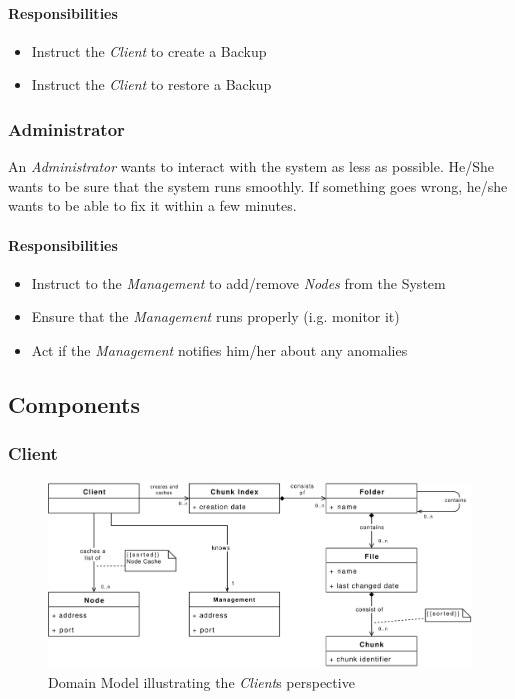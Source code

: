 \paragraph{Responsibilities}
\begin{itemize}
    \item Instruct the \emph{Client} to create a Backup
    \item Instruct the \emph{Client} to restore a Backup
\end{itemize}


\subsubsection{Administrator}
An \emph{Administrator} wants to interact with the system as less as possible. He/She wants to be sure that the system runs smoothly. If something goes wrong, he/she wants to be able to fix it within a few minutes.

\paragraph{Responsibilities}
\begin{itemize}
    \item Instruct to the \emph{Management} to add/remove \emph{Nodes} from the System
    \item Ensure that the \emph{Management} runs properly (i.g. monitor it)
    \item Act if the \emph{Management} notifies him/her about any anomalies
\end{itemize}

\subsection{Components}

\subsubsection{Client}
\label{sec:component-client}

\begin{figure}[h]
    \centering
    \includegraphics[width=1\linewidth]{resources/client_domain_model}
    \caption[Client Domain Model]{Domain Model illustrating the \emph{Client}s perspective}
\end{figure}

